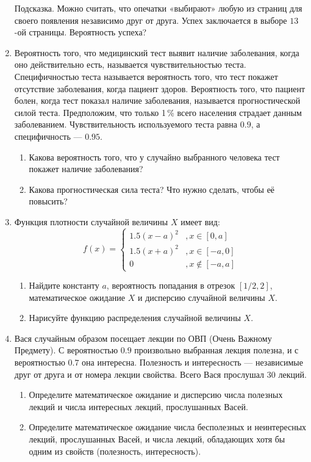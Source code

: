 \begin{enumerate}
Подсказка. Можно считать, что опечатки «выбирают» любую из страниц для своего
появления независимо друг от друга. Успех заключается в выборе $13$-ой страницы.
Вероятность успеха?

\item Вероятность того, что медицинский тест выявит наличие заболевания,
когда оно действительно есть, называется чувствительностью теста. Специфичностью
теста называется вероятность того, что тест покажет отсутствие заболевания,
когда пациент здоров. Вероятность того, что пациент болен, когда тест показал
наличие заболевания, называется прогностической силой теста. Предположим, что
только 1\,\%  всего населения страдает данным заболеванием.  Чувствительность
используемого теста равна $0.9$, а специфичность — $0.95$.
\begin{enumerate}
\item Какова вероятность того, что у случайно выбранного человека тест покажет
наличие заболевания?
\item Какова прогностическая сила теста? Что нужно сделать, чтобы её повысить?
\end{enumerate}

\item Функция плотности случайной величины $X$ имеет вид:
\begin{equation*}
f(x) =
 \begin{cases}
   1.5 (x-a)^2 &, x \in [0,a]\\
   1.5 (x+a)^2 &, x \in [-a,0]\\
   0 &, x \not\in [-a,a]
 \end{cases}
\end{equation*}

\begin{enumerate}
\item Найдите константу $a$, вероятность попадания в отрезок $\left[1/2, 2 \right]$,
математическое ожидание $X$ и дисперсию случайной величины $X$.
\item Нарисуйте функцию распределения случайной величины $X$.
\end{enumerate}

\item Вася случайным образом посещает лекции по ОВП (Очень Важному Предмету).
С вероятностью $0.9$ произвольно выбранная лекция полезна, и с вероятностью $0.7$ она интересна.
Полезность и интересность — независимые друг от друга и от номера лекции свойства.
Всего Вася прослушал 30 лекций.
\begin{enumerate}
\item Определите математическое ожидание и дисперсию числа полезных лекций и
числа интересных лекций, прослушанных Васей.
\item Определите математическое ожидание числа бесполезных и неинтересных лекций,
прослушанных Васей, и числа лекций, обладающих хотя бы одним из свойств (полезность,
интересность).
\end{enumerate}


\end{enumerate}
